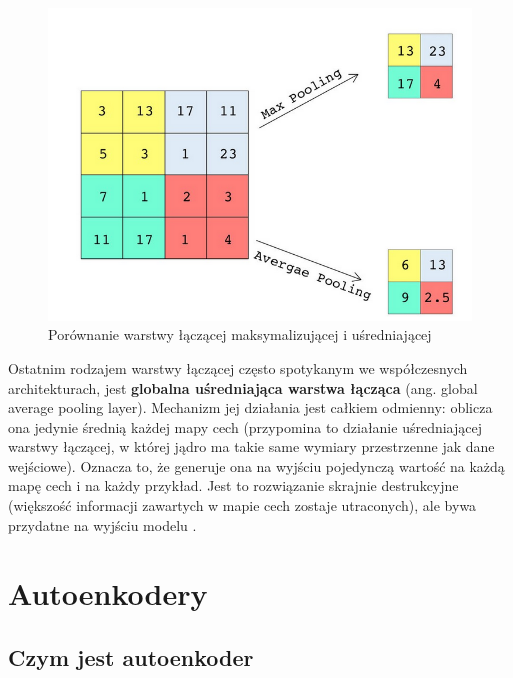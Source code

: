 \documentclass[12pt]{mwbk}
\theoremstyle{plain}
\theoremstyle{definition}
\theoremstyle{remark}
\newcommand\zrodlo[1]{\par\vspace{-3mm}{\small\textit{Źródło: }#1 }}
\begin{document}
\begin{figure}[!h]
	\centering
	\includegraphics[width=0.7\linewidth]{rys/max_avg_pooling.png}
	\caption{Porównanie warstwy łączącej maksymalizującej i uśredniającej}
	\zrodlo{\cite{geron}}
	\label{fig:max-avg-pooling}
\end{figure}

Ostatnim rodzajem warstwy łączącej często spotykanym we współczesnych architekturach, jest
\textbf{globalna uśredniająca warstwa łącząca} (ang. global average pooling layer). Mechanizm jej działania
jest całkiem odmienny: oblicza ona jedynie średnią każdej mapy cech (przypomina to działanie
uśredniającej warstwy łączącej, w której jądro ma takie same wymiary przestrzenne jak dane
wejściowe). Oznacza to, że generuje ona na wyjściu pojedynczą wartość na każdą mapę cech
i na każdy przykład. Jest to  rozwiązanie skrajnie destrukcyjne (większość informacji
zawartych w mapie cech zostaje utraconych), ale bywa przydatne na wyjściu modelu \cite{geron}.


	
\section{Autoenkodery}
	
\subsection{Czym jest autoenkoder}
\end{document}
